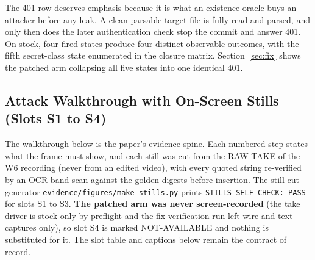 \documentclass[journal]{IEEEtran}
\begin{document}
The 401 row deserves emphasis because it is what an existence oracle buys an
attacker before any leak. A clean-parsable target file is fully read and
parsed, and only then does the later authentication check stop the commit and
answer 401. On stock, four fired states produce four distinct observable
outcomes, with the fifth secret-class state enumerated in the closure matrix.
Section~\ref{sec:fix} shows the patched arm collapsing all five states into
one identical 401.

\subsection{Attack Walkthrough with On-Screen Stills (Slots S1 to S4)}
\label{sec:walkthrough}

The walkthrough below is the paper's evidence spine. Each numbered step states
what the frame must show, and each still was cut from the RAW TAKE of the W6
recording (never from an edited video), with every quoted string re-verified
by an OCR band scan against the golden digests before insertion. The still-cut
generator \texttt{evidence/figures/make\_stills.py} prints
\texttt{STILLS SELF-CHECK: PASS} for slots S1 to S3.
\textbf{The patched arm was never screen-recorded} (the take driver is
stock-only by preflight and the fix-verification run left wire and text
captures only), so slot S4 is marked NOT-AVAILABLE and nothing is substituted
for it. The slot table and captions below remain the contract of record.
\end{document}
